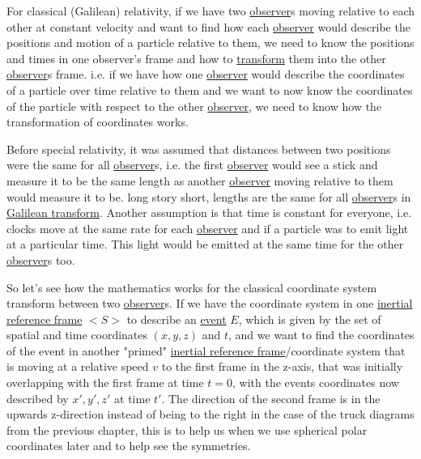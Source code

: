 For classical (Galilean) relativity, if we have two \hyperlink{def-observer}{observer}s moving relative to each other at constant velocity and want to find how each \hyperlink{def-observer}{observer} would describe the positions and motion of a particle relative to them, we need to know the positions and times in one observer's frame and how to \hyperlink{def-transform}{transform} them into the other \hyperlink{def-observer}{observer}s frame. i.e. if we have how one \hyperlink{def-observer}{observer} would describe the coordinates of a particle over time relative to them and we want to now know the coordinates of the particle with respect to the other \hyperlink{def-observer}{observer}, we need to know how the transformation of coordinates works.

Before special relativity, it was assumed that distances between two positions were the same for all \hyperlink{def-observer}{observer}s, i.e. the first \hyperlink{def-observer}{observer} would see a stick and measure it to be the same length as another \hyperlink{def-observer}{observer} moving relative to them would measure it to be. long story short, lengths are the same for all \hyperlink{def-observer}{observer}s in \hyperlink{def-galilean-transform}{Galilean transform}. Another assumption is that time is constant for everyone, i.e. clocks move at the same rate for each \hyperlink{def-observer}{observer} and if a particle was to emit light at a particular time. This light would be emitted at the same time for the other \hyperlink{def-observer}{observer}s too.

So let's see how the mathematics works for the classical coordinate system transform between two \hyperlink{def-observer}{observer}s. If we have the coordinate system in one \hyperlink{def-Inertial-reference-frame}{inertial reference frame} $<\!\!S\!>$ to describe an \hyperlink{def-event}{event} $E$, which is given by the set of spatial and time coordinates $(x,y,z)$ and $t$, and we want to find the coordinates of the event in another "primed" \hyperlink{def-Inertial-reference-frame}{inertial reference frame}/coordinate system that is moving at a relative speed $v$ to the first frame in the z-axis, that was initially overlapping with the first frame at time $t=0$, with the events coordinates now described by $x', y', z'$ at time $t'$. The direction of the second frame is in the upwards z-direction instead of being to the right in the case of the truck diagrams from the previous chapter, this is to help us when we use spherical polar coordinates later and to help see the symmetries.

